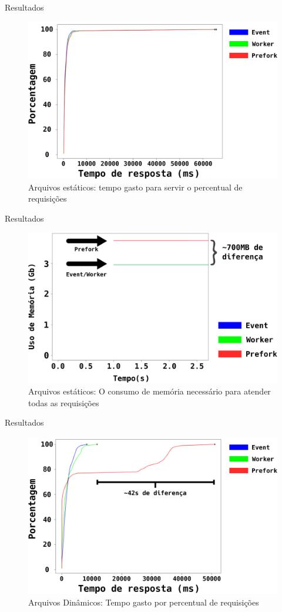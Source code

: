 \documentclass[xcolor={usenames,svgnames,dvipsnames},brazil,english,12pt,aspectratio=149]{beamer}
\begin{document}
\begin{frame}{Resultados}
  \begin{figure}[!h]
    \centering
    \includegraphics[width=.60\textwidth]{static_file}
    \caption{Arquivos estáticos: tempo gasto para servir o percentual de requisições}
    \label{fig:static_file}
  \end{figure}
\end{frame}

\begin{frame}{Resultados}
  \begin{figure}[!h]
    \centering
    \includegraphics[width=.70\textwidth]{static_file_memory_usage}
    \caption{Arquivos estáticos: O consumo de memória necessário para atender todas as requisições}
    \label{fig:static_file_memory}
  \end{figure}
\end{frame}

\begin{frame}{Resultados}
  \begin{figure}[!h]
    \centering
    \includegraphics[width=.60\textwidth]{dynamic_file_request_time}

    \caption{Arquivos Dinâmicos: Tempo gasto por percentual de requisições}
    \label{fig:dynamic_file}
  \end{figure}
\end{frame}
\end{document}

